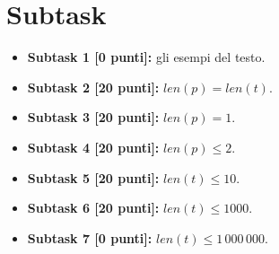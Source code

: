 \section*{Subtask}
  \begin{itemize}
    \item \textbf{Subtask 1 [0 punti]:} gli esempi del testo.
    \item \textbf{Subtask 2 [20 punti]:} $len(p) = len(t)$.
    \item \textbf{Subtask 3 [20 punti]:} $len(p) = 1$.
    \item \textbf{Subtask 4 [20 punti]:} $len(p) \le 2$.
    \item \textbf{Subtask 5 [20 punti]:} $len(t) \le 10$.
    \item \textbf{Subtask 6 [20 punti]:} $len(t) \le 1000$.
    \item \textbf{Subtask 7 [0 punti]:} $len(t) \le 1\,000\,000$.
  \end{itemize}
